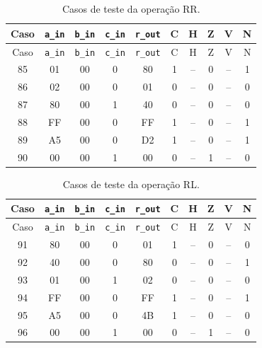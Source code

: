 \begin{longtable}{c c c c c c c c c c}
\caption{Casos de teste da operação RR.}
\label{tab:testes-RR}\\
\hline
Caso & \texttt{a\_in} & \texttt{b\_in} & \texttt{c\_in} & \texttt{r\_out} & C & H & Z & V & N \\ \hline
\endfirsthead
\hline
Caso & \texttt{a\_in} & \texttt{b\_in} & \texttt{c\_in} & \texttt{r\_out} & C & H & Z & V & N \\ \hline
\endhead
85 & 01 & 00 & 0 & 80 & 1 & {\footnotesize--} & 0 & {\footnotesize--} & 1 \\
86 & 02 & 00 & 0 & 01 & 0 & {\footnotesize--} & 0 & {\footnotesize--} & 0 \\
87 & 80 & 00 & 1 & 40 & 0 & {\footnotesize--} & 0 & {\footnotesize--} & 0 \\
88 & FF & 00 & 0 & FF & 1 & {\footnotesize--} & 0 & {\footnotesize--} & 1 \\
89 & A5 & 00 & 0 & D2 & 1 & {\footnotesize--} & 0 & {\footnotesize--} & 1 \\
90 & 00 & 00 & 1 & 00 & 0 & {\footnotesize--} & 1 & {\footnotesize--} & 0 \\
\hline
\end{longtable}
\vspace{-0.5cm}

\begin{longtable}{c c c c c c c c c c}
\caption{Casos de teste da operação RL.}
\label{tab:testes-RL}\\
\hline
Caso & \texttt{a\_in} & \texttt{b\_in} & \texttt{c\_in} & \texttt{r\_out} & C & H & Z & V & N \\ \hline
\endfirsthead
\hline
Caso & \texttt{a\_in} & \texttt{b\_in} & \texttt{c\_in} & \texttt{r\_out} & C & H & Z & V & N \\ \hline
\endhead
91 & 80 & 00 & 0 & 01 & 1 & {\footnotesize--} & 0 & {\footnotesize--} & 0 \\
92 & 40 & 00 & 0 & 80 & 0 & {\footnotesize--} & 0 & {\footnotesize--} & 1 \\
93 & 01 & 00 & 1 & 02 & 0 & {\footnotesize--} & 0 & {\footnotesize--} & 0 \\
94 & FF & 00 & 0 & FF & 1 & {\footnotesize--} & 0 & {\footnotesize--} & 1 \\
95 & A5 & 00 & 0 & 4B & 1 & {\footnotesize--} & 0 & {\footnotesize--} & 0 \\
96 & 00 & 00 & 1 & 00 & 0 & {\footnotesize--} & 1 & {\footnotesize--} & 0 \\
\hline
\end{longtable}
\vspace{-0.5cm}
